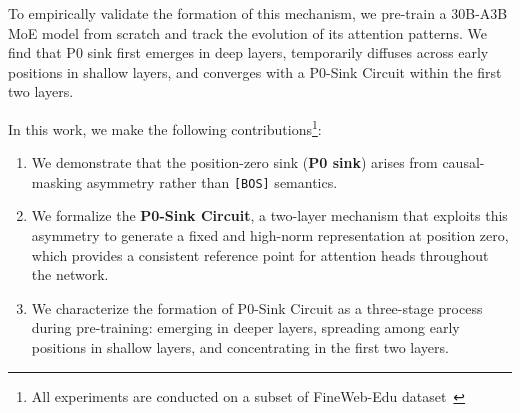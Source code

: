 \documentclass[]{template}
\theoremstyle{plain}
\theoremstyle{definition}
\theoremstyle{remark}
\begin{document}
To empirically validate the formation of this mechanism, we pre-train a 30B-A3B MoE model from scratch and track the evolution of its attention patterns. We find that P0 sink first emerges in deep layers, temporarily diffuses across early positions in shallow layers, and converges with a P0-Sink Circuit within the first two layers.




In this work, we make the following contributions\footnote{All experiments are conducted on a subset of FineWeb-Edu dataset~\citep{lozhkov2024fineweb-edu}}:
\begin{enumerate}
    \item We demonstrate that the position-zero sink (\textbf{P0 sink}) arises from causal-masking asymmetry rather than \texttt{[BOS]} semantics. 
    \item We formalize the \textbf{P0-Sink Circuit}, a two-layer mechanism that exploits this asymmetry to generate a fixed and high-norm representation at position zero, which provides a consistent reference point for attention heads throughout the network.
    \item We characterize the formation of P0-Sink Circuit as a three-stage process during pre-training: emerging in deeper layers, spreading among early positions in shallow layers, and concentrating in the first two layers.
\end{enumerate}
\end{document}
